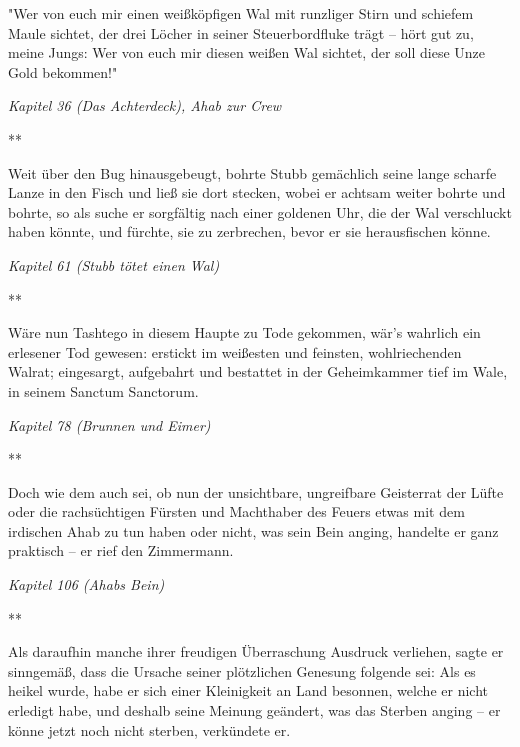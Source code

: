\documentclass[a5paper,9pt,twoside=false]{extbook}
\begin{document}
\noindent "Wer von euch mir einen weißköpfigen Wal mit runzliger Stirn und schiefem Maule sichtet, der drei Löcher in seiner Steuerbordfluke trägt -- hört gut zu, meine Jungs: Wer von euch mir diesen weißen Wal sichtet, der soll diese Unze Gold bekommen!"

\medskip
\noindent\footnotesize{\textit{Kapitel 36 (Das Achterdeck), Ahab zur Crew}}
\normalsize

\medskip
{\centering \small*** \\}
\bigskip

\noindent Weit über den Bug hinausgebeugt, bohrte Stubb gemächlich seine lange scharfe Lanze in den Fisch und ließ sie dort stecken, wobei er achtsam weiter bohrte und bohrte, so als suche er sorgfältig nach einer goldenen Uhr, die der Wal verschluckt haben könnte, und fürchte, sie zu zerbrechen, bevor er sie herausfischen könne.

\medskip
\noindent\footnotesize{\textit{Kapitel 61 (Stubb tötet einen Wal)}}
\normalsize

\medskip
{\centering \small*** \\}
\bigskip

\noindent Wäre nun Tashtego in diesem Haupte zu Tode gekommen, wär's wahrlich ein erlesener Tod gewesen: erstickt im weißesten und feinsten, wohlriechenden Walrat; eingesargt, aufgebahrt und bestattet in der Geheimkammer tief im Wale, in seinem Sanctum Sanctorum.

\medskip
\noindent\footnotesize{\textit{Kapitel 78 (Brunnen und Eimer)}}
\normalsize

\medskip
{\centering \small*** \\}
\bigskip

\noindent Doch wie dem auch sei, ob nun der unsichtbare, ungreifbare Geisterrat der Lüfte oder die rachsüchtigen Fürsten und Machthaber des Feuers etwas mit dem irdischen Ahab zu tun haben oder nicht, was sein Bein anging, handelte er ganz praktisch -- er rief den Zimmermann.

\medskip
\noindent\footnotesize{\textit{Kapitel 106 (Ahabs Bein)}}
\normalsize

\medskip
{\centering \small*** \\}
\bigskip

\noindent Als daraufhin manche ihrer freudigen Überraschung Ausdruck verliehen, sagte er sinngemäß, dass die Ursache seiner plötzlichen Genesung folgende sei: Als es heikel wurde, habe er sich einer Kleinigkeit an Land besonnen, welche er nicht erledigt habe, und deshalb seine Meinung geändert, was das Sterben anging -- er könne jetzt noch nicht sterben, verkündete er. %
\end{document}
